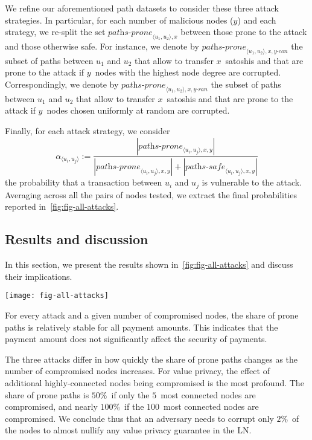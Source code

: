 We refine our aforementioned path datasets to consider these three attack strategies.
In particular, for each number of malicious nodes ($y$) and each strategy, we re-split the set $\textit{paths-prone}_{\langle u_1, u_2 \rangle, x}$ between those prone to the attack and those otherwise safe.
For instance, we denote by $\textit{paths-prone}_{\langle u_1, u_2 \rangle, x, y\textit{-con}}$ the subset of paths between $u_1$ and $u_2$ that allow to transfer $x$~satoshis and that are prone to the attack if $y$~nodes with the highest node degree are corrupted.
Correspondingly, we denote by $\textit{paths-prone}_{\langle u_1, u_2 \rangle, x, y\textit{-ran}}$ the subset of paths between $u_1$ and $u_2$ that allow to transfer $x$~satoshis and that are prone to the attack if $y$~nodes chosen uniformly at random are corrupted.

Finally, for each attack strategy, we consider $$\alpha_{\langle u_i, u_j \rangle} := \frac{|\textit{paths-prone}_{\langle u_i, u_j \rangle, x, y}|}{|\textit{paths-prone}_{\langle u_i, u_j \rangle, x, y}| + |\textit{paths-safe}_{\langle u_i, u_j \rangle, x, y}|}$$ the probability that a transaction between $u_i$ and $u_j$ is vulnerable to the attack.
Averaging across all the pairs of nodes tested, we extract the final probabilities reported in~\cref{fig:fig-all-attacks}.


\subsection{Results and discussion}

In this section, we present the results shown in~\cref{fig:fig-all-attacks} and discuss their implications.
\begin{figure*}
	\centering
	\texttt{[image: fig-all-attacks]}
	\caption{Share of vulnerable paths for each attack, considering that the highest degree nodes are compromised (top), the highest capacity nodes are compromised (middle), or random nodes are compromised (bottom).}
	\label{fig:fig-all-attacks}
\end{figure*}

For every attack and a given number of compromised nodes, the share of prone paths is relatively stable for all payment amounts.
This indicates that the payment amount does not significantly affect the security of payments.

The three attacks differ in how quickly the share of prone paths changes as the number of compromised nodes increases.
For value privacy, the effect of additional highly-connected nodes being compromised is the most profound.
The share of prone paths is $50\%$~if only the $5$~most connected nodes are compromised, and nearly $100\%$~if the $100$~most connected nodes are compromised.
We conclude thus that an adversary needs to corrupt only $2\%$~of the nodes to almost nullify any value privacy guarantee in the LN.

